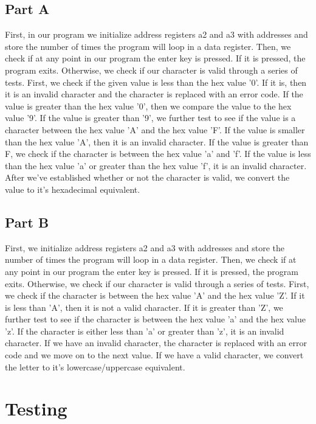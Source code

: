 \documentclass[10pt, letterpaper, titlepage]{article} %
\begin{document}
\begin{multicols*}{2}
\subsection{Part A}
First, in our program we initialize address registers a2 and a3 with addresses and store the number of times the program will loop in a data register. Then, we check if at any point in our program the enter key is pressed. If it is pressed, the program exits. Otherwise, we check if our character is valid through a series of tests. First, we check if the given value is less than the hex value '0'. If it is, then it is an invalid character and the character is replaced with an error code. If the value is greater than the hex value '0', then we compare the value to the hex value '9'. If the value is greater than '9', we further test to see if the value is a character between the hex value 'A' and the hex value 'F'. If the value is smaller than the hex value 'A', then it is an invalid character. If the value is greater than F, we check if the character is between the hex value 'a' and 'f'. If the value is less than the hex value 'a' or greater than the hex value 'f', it is an invalid character. After we've established whether or not the character is valid, we convert the value to it's hexadecimal equivalent.

\subsection{Part B}
First, we initialize address registers a2 and a3 with addresses and store the number of times the program will loop in a data register. Then, we check if at any point in our program the enter key is pressed. If it is pressed, the program exits. Otherwise, we check if our character is valid through a series of tests. First, we check if the character is between the hex value 'A' and the hex value 'Z'. If it is less than 'A', then it is not a valid character. If it is greater than 'Z', we further test to see if the character is between the hex value 'a' and the hex value 'z'. If the character is either less than 'a' or greater than 'z', it is an invalid character. If we have an invalid character, the character is replaced with an error code and we move on to the next value. If we have a valid character, we convert the letter to it's lowercase/uppercase equivalent.



\section{Testing}

\end{multicols*}
\end{document}
